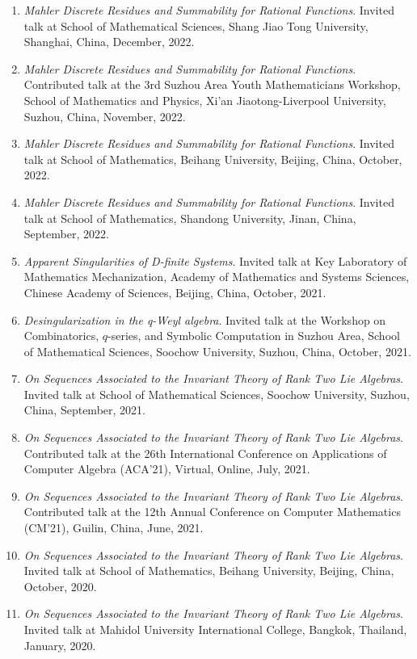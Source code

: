 \documentclass[a4paper,12pt]{article}
\begin{document}
\begin{enumerate}
\item {\em Mahler Discrete Residues and Summability for Rational Functions}. 
Invited talk at School of Mathematical Sciences, Shang Jiao Tong University, Shanghai, China, December, 2022. 
\item {\em Mahler Discrete Residues and Summability for Rational Functions}. 
Contributed talk at the 3rd Suzhou Area Youth Mathematicians Workshop, School of Mathematics and Physics, Xi'an Jiaotong-Liverpool  University, Suzhou, China, November, 2022. 
\item {\em Mahler Discrete Residues and Summability for Rational Functions}. 
Invited talk at School of Mathematics, Beihang University, Beijing, China, October, 2022. 
\item {\em Mahler Discrete Residues and Summability for Rational Functions}. 
Invited talk at School of Mathematics, Shandong University, Jinan, China, September, 2022. 
\item {\em Apparent Singularities of D-finite Systems}.
Invited talk at Key Laboratory of Mathematics Mechanization, Academy of Mathematics and Systems Sciences,
 Chinese Academy of Sciences, Beijing, China, October, 2021. 
 \item {\em Desingularization in the q-Weyl algebra}. 
 Invited talk at the Workshop on Combinatorics, $q$-series, and Symbolic Computation in Suzhou Area, School of Mathematical Sciences, Soochow University, Suzhou, China, October, 2021.
\item {\em On Sequences Associated to the Invariant Theory of Rank Two Lie Algebras}.
Invited talk at School of Mathematical Sciences, Soochow University, Suzhou, 
China, September, 2021.
\item {\em On Sequences Associated to the Invariant Theory of Rank Two Lie Algebras}.
Contributed talk at the 26th International Conference on Applications of Computer Algebra (ACA'21), Virtual, Online, July, 2021.
\item {\em On Sequences Associated to the Invariant Theory of Rank Two Lie Algebras}.
Contributed talk at the 12th Annual Conference on Computer Mathematics (CM'21), Guilin, China, June, 2021.
\item {\em On Sequences Associated to the Invariant Theory of Rank Two Lie Algebras}.
Invited talk at School of Mathematics, Beihang University, Beijing, China, October, 2020.
\item {\em On Sequences Associated to the Invariant Theory of Rank Two Lie Algebras}.
Invited talk at Mahidol University International College, Bangkok, Thailand, January, 2020.

\end{enumerate}
\end{document}
